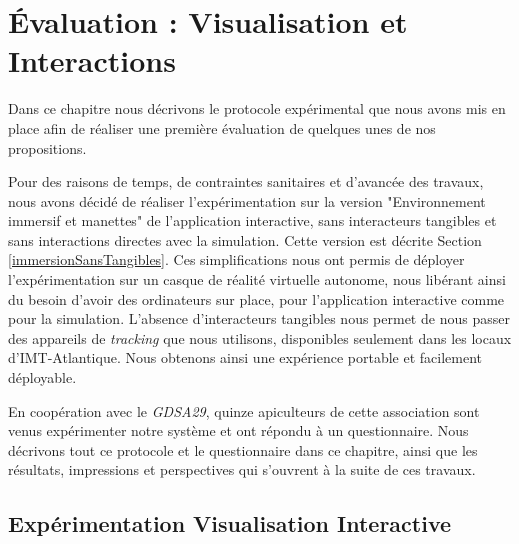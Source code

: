 \chapter{Évaluation : Visualisation et Interactions}
\label{ChapitreEvalVR}

	Dans ce chapitre nous décrivons le protocole expérimental que nous avons mis en place afin de réaliser une première évaluation de quelques unes de nos propositions.
	
	Pour des raisons de temps, de contraintes sanitaires et d'avancée des travaux, nous avons décidé de réaliser l'expérimentation sur la version "Environnement immersif et manettes" de l'application interactive, sans interacteurs tangibles et sans interactions directes avec la simulation. Cette version est décrite Section \ref{immersionSansTangibles}. Ces simplifications nous ont permis de déployer l'expérimentation sur un casque de réalité virtuelle autonome, nous libérant ainsi du besoin d'avoir des ordinateurs sur place, pour l'application interactive comme pour la simulation. L'absence d'interacteurs tangibles nous permet de nous passer des appareils de \textit{tracking} que nous utilisons, disponibles seulement dans les locaux d'IMT-Atlantique. Nous obtenons ainsi une expérience portable et facilement déployable.
	
	En coopération avec le \textit{GDSA29}, quinze apiculteurs de cette association sont venus expérimenter notre système et ont répondu à un questionnaire. Nous décrivons tout ce protocole et le questionnaire dans ce chapitre, ainsi que les résultats, impressions et perspectives qui s'ouvrent à la suite de ces travaux.

	\section{Expérimentation Visualisation Interactive}
		\label{sectionExpe}
		
